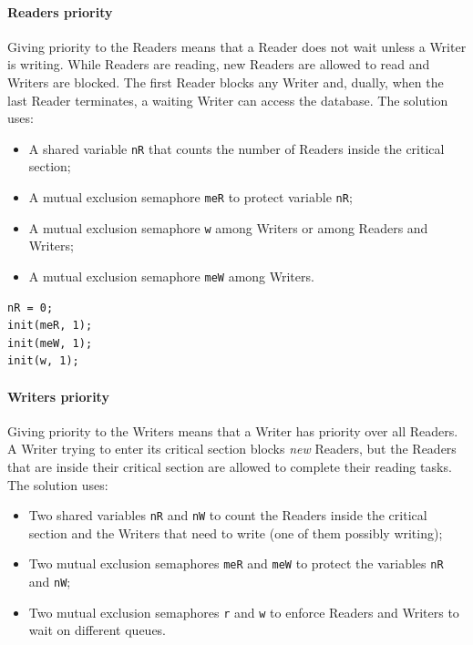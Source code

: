 \paragraph{Readers priority}
Giving priority to the Readers means that a Reader does not wait unless a Writer is writing. While Readers are reading, new Readers are allowed to read and Writers are blocked. The first Reader blocks any Writer and, dually, when the last Reader terminates, a waiting Writer can access the database. The solution uses:

\begin{itemize}
\item A shared variable \texttt{nR} that counts the number of Readers inside the critical section;
\item A mutual exclusion semaphore \texttt{meR} to protect variable \texttt{nR};
\item A mutual exclusion semaphore \texttt{w} among Writers or among Readers and Writers;
\item A mutual exclusion semaphore \texttt{meW} among Writers.
\end{itemize}

\begin{verbatim}
nR = 0;
init(meR, 1);
init(meW, 1);
init(w, 1);
\end{verbatim}

\begin{Parallel}{}{}
\end{Parallel}

\paragraph{Writers priority}
Giving priority to the Writers means that a Writer has priority over all Readers. A Writer trying to enter its critical section blocks \textit{new} Readers, but the Readers that are inside their critical section are allowed to complete their reading tasks. The solution uses:

\begin{itemize}
\item Two shared variables \texttt{nR} and \texttt{nW} to count the Readers inside the critical section and the Writers that need to write (one of them possibly writing);
\item Two mutual exclusion semaphores \texttt{meR} and \texttt{meW} to protect the variables \texttt{nR} and \texttt{nW};
\item Two mutual exclusion semaphores \texttt{r} and \texttt{w} to enforce Readers and Writers to wait on different queues.
\end{itemize}

